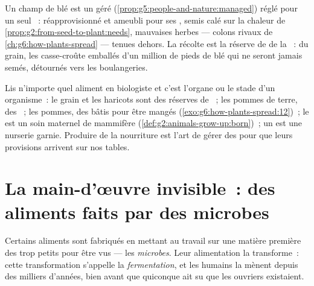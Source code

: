 \begin{example}\label{ex:g6:producing-our-food:wheat}
Un champ de blé est un  géré
(\cref{prop:g5:people-and-nature:managed}) réglé pour un seul
~:  réapprovisionné et ameubli pour ses , semis
calé sur la chaleur de \cref{prop:g2:from-seed-to-plant:needs},
mauvaises herbes --- colons rivaux de
\cref{ch:g6:how-plants-spread} --- tenues dehors. La récolte est la
réserve de  de la ~: du grain, les casse-croûte
emballés d'un million de pieds de blé qui ne seront jamais semés,
détournés vers les boulangeries.
\end{example}

\begin{remark}\label{rem:g6:producing-our-food:stage}
Lis n'importe quel aliment en biologiste et c'est l'organe ou le
stade d'un organisme~: le grain et les haricots sont des réserves de
~; les pommes de terre, des ~; les pommes, des
 bâtis pour être mangés
(\cref{exo:g6:how-plants-spread:12})~; le  est un soin maternel
de mammifère (\cref{def:g2:animals-grow-up:born})~; un  est une
nurserie garnie. Produire de la nourriture est l'art de gérer des
 pour que leurs provisions arrivent sur nos tables.
\end{remark}

\section{La main-d'œuvre invisible~: des aliments faits par des microbes}

\begin{definition}[Fermentation]\label{def:g6:producing-our-food:fermentation}
Certains aliments sont fabriqués en mettant au travail sur une
matière première des  trop petits pour être vus --- les
\emph{microbes}. Leur alimentation la
transforme~: cette transformation s'appelle la
\emph{fermentation}, et les humains la mènent
depuis des milliers d'années, bien avant que quiconque ait su que
les ouvriers existaient.
\end{definition}

